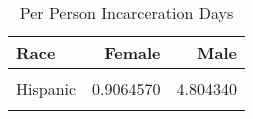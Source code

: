 \begin{table}[H]

\caption{\label{tab:tab:summarystats}Per Person Incarceration Days}
\centering
\begin{tabular}[t]{lrr}
\toprule
Race & Female & Male\\
\midrule
\cellcolor{gray!6}{Black} & \cellcolor{gray!6}{0.6426056} & \cellcolor{gray!6}{14.833333}\\
Hispanic & 0.9064570 & 4.804340\\
\cellcolor{gray!6}{Non-Black / Non-Hispanic} & \cellcolor{gray!6}{0.5876265} & \cellcolor{gray!6}{3.344241}\\
\bottomrule
\end{tabular}
\end{table}
